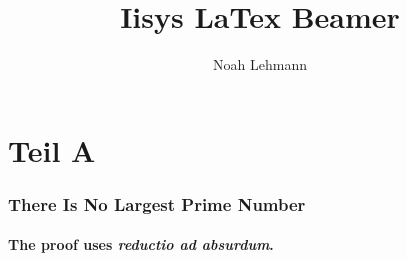 \documentclass[12pt]{beamer}
\title{Iisys LaTex Beamer}
\author{Noah Lehmann}
\institute{FG Intelligente \& Lernende Systeme}
\begin{document}
    \begin{frame}
        \titlepage
    \end{frame}


    \section{Teil A}
    \begin{frame}
        \frametitle{There Is No Largest Prime Number}
        \framesubtitle{The proof uses \textit{reductio ad absurdum}.}
    \end{frame}
\end{document}
